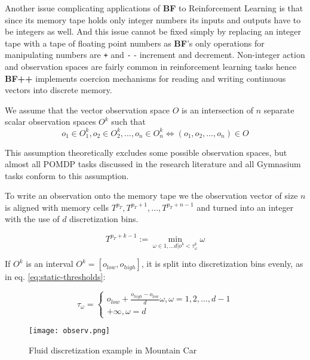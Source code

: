 Another issue complicating applications of \textbf{BF} to Reinforcement Learning is that since its memory tape holds only integer numbers its inputs and outputs have to be integers as well.
And this issue cannot be fixed simply by replacing an integer tape with a tape of floating point numbers as \textbf{BF}'s only operations for manipulating numbers are \texttt{+} and \texttt{-} - increment and decrement.
Non-integer action and observation spaces are fairly common in reinforcement learning tasks hence \textbf{BF++} implements coercion mechanisms for reading and writing continuous vectors into discrete memory.

We assume that the vector observation space $O$ is an intersection of $n$ separate scalar observation spaces $O^k$ such that 
\begin{equation}
 o_1 \in O_1^k,o_2 \in O_2^k,\dots,o_n \in O_n^k \Leftrightarrow (o_1,o_2,\dots,o_n) \in O  
\end{equation}

This assumption theoretically excludes some possible observation spaces, but almost all POMDP tasks discussed in the research literature and all Gymnasium tasks conform to this assumption.

To write an observation onto the memory tape we the observation vector of size $n$ is aligned with memory cells $T^{p_T},T^{p_T+1},\dots,T^{p_T+n-1}$ and turned into an integer with the use of $d$ discretization bins.

\begin{equation}
\label{eq:discretization}
T^{p_T+k-1} := \min_{\omega \in 1,\dots d | o^k < \tau^k_\omega} \omega
\end{equation}

If $O^k$ is an interval $O^k=[o_{low}, o_{high}]$, it is split into discretization bins evenly, as in eq. \ref{eq:static-thresholds}:

\begin{equation}
\label{eq:static-thresholds}
\tau_\omega = \begin{cases}
o_{low}+\frac{o_{high}-o_{low}}{d}\omega, \omega=1,2,\dots,d-1 \\
+\infty, \omega=d 
\end{cases}
\end{equation}

\begin{figure}
    \centering
    \texttt{[image: observ.png]}
    \caption{Fluid discretization example in Mountain Car}
    \label{fig:obs}
\end{figure}

